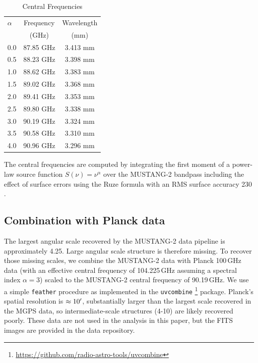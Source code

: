\documentclass[twocolumn]{aastex62}
\newcommand{\MUSTANG}{MUSTANG-2\xspace}
\begin{document}
\begin{table}[htp]
\centering
    \caption{Central Frequencies}
\begin{tabular}{lcc}
    \label{tab:centralfreq}
$\alpha$ & Frequency & Wavelength\\
         & (GHz)       & (mm) \\
\hline
0.0 & 87.85 GHz & 3.413 mm\\
0.5 & 88.23 GHz & 3.398 mm\\
1.0 & 88.62 GHz & 3.383 mm\\
1.5 & 89.02 GHz & 3.368 mm\\
2.0 & 89.41 GHz & 3.353 mm\\
2.5 & 89.80 GHz & 3.338 mm\\
3.0 & 90.19 GHz & 3.324 mm\\
3.5 & 90.58 GHz & 3.310 mm\\
4.0 & 90.96 GHz & 3.296 mm\\
\hline
\end{tabular}
\par The central frequencies are computed by integrating the first moment of a
power-law source function $S(\nu) = \nu^{\alpha}$ over the \MUSTANG
bandpass including the effect of surface errors using the Ruze formula
with an RMS surface accuracy 230 \um \citep{Frayer2018a}.

\end{table}

\subsection{Combination with Planck data\label{sec:feather}}
The largest angular scale recovered by the \MUSTANG data pipeline is
approximately 4.25\arcmin.  Large angular scale structure is therefore missing.
To recover those missing scales, we combine the \MUSTANG data with
Planck 100\,GHz data (with an effective central frequency of 104.225\,GHz
assuming a spectral index $\alpha=3$) scaled to the \MUSTANG central frequency
of 90.19\,GHz.  We use a simple \texttt{feather} procedure \citep{Cotton2017a}
as implemented in the \texttt{uvcombine}
\footnote{\url{https://github.com/radio-astro-tools/uvcombine}} package.
Planck's spatial resolution is $\approx10\mbox{$^\prime$}$, substantially larger
than the largest scale recovered in the MGPS data, so intermediate-scale
structures (4-10\arcmin) are likely recovered poorly.
These data are not used in the analysis in this paper, but the
FITS images are provided in the data repository.
\end{document}
